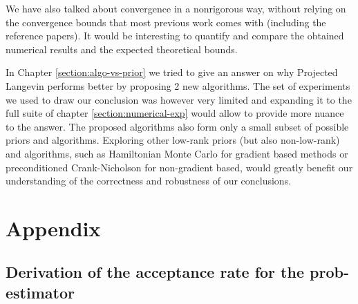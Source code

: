 \documentclass[12pt]{memoir}
\begin{document}
We have also talked about convergence in a nonrigorous way, without relying on the convergence bounds that most previous work comes with (including the reference papers). It would be interesting to quantify and compare the obtained numerical results and the expected theoretical bounds.\medbreak

In Chapter \ref{section:algo-vs-prior} we tried to give an answer on why Projected Langevin performs better by proposing 2 new algorithms. The set of experiments we used to draw our conclusion was however very limited and expanding it to the full suite of chapter \ref{section:numerical-exp} would allow to provide more nuance to the answer. The proposed algorithms also form only a small subset of possible priors and algorithms. Exploring other low-rank priors (but also non-low-rank) and algorithms, such as Hamiltonian Monte Carlo for gradient based methods or preconditioned Crank-Nicholson for non-gradient based, would greatly benefit our understanding of the correctness and robustness of our conclusions.

% 
% 
\printbibliography

\chapter*{Appendix}
\section*{Derivation of the acceptance rate for the prob-estimator}\label{section:appendix:acc-rate-prob}
\end{document}
